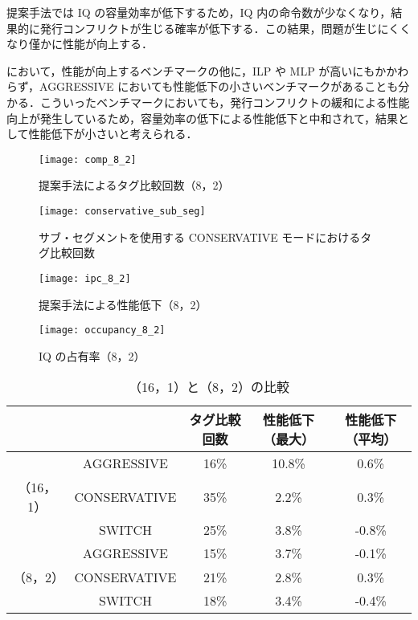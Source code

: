 提案手法では IQ の容量効率が低下するため，IQ 内の命令数が少なくなり，結果的に発行コンフリクトが生じる確率が低下する．この結果，問題が生じにくくなり僅かに性能が向上する．

において，性能が向上するベンチマークの他に，ILP や MLP が高いにもかかわらず，AGGRESSIVE においても性能低下の小さいベンチマークがあることも分かる．こういったベンチマークにおいても，発行コンフリクトの緩和による性能向上が発生しているため，容量効率の低下による性能低下と中和されて，結果として性能低下が小さいと考えられる．

\begin{figure}[htb]
  \centering
  \texttt{[image: comp\_8\_2]}
  \caption{提案手法によるタグ比較回数（8，2）}
  \label{fig:comp_8_2}
\end{figure}

\begin{figure}[htb]
  \centering
  \texttt{[image: conservative\_sub\_seg]}
  \caption{サブ・セグメントを使用する CONSERVATIVE モードにおけるタグ比較回数}
  \label{fig:conservative_sub_seg}
\end{figure}

\begin{figure}[htb]
  \centering
  \texttt{[image: ipc\_8\_2]}
  \caption{提案手法による性能低下（8，2）}
  \label{fig:ipc_8_2}
\end{figure}
\begin{figure}[htb]
  \centering
  \texttt{[image: occupancy\_8\_2]}
  \caption{IQ の占有率（8，2）}
  \label{fig:occupancy_8_2}
\end{figure}

\begin{table}[htb]
  \caption{（16，1）と（8，2）の比較}
  \footnotesize
  \center
    \begin{tabular}{cc|c|c|c} \hline \hline
     & & タグ比較回数 & 性能低下（最大） & 性能低下（平均）\\\hline
     & AGGRESSIVE  & 16\%  & 10.8\% & 0.6\% \\
    （16，1） & CONSERVATIVE & 35\% & 2.2\% & 0.3\% \\ \
     & SWITCH & 25\% & 3.8\% & -0.8\% \\ \hline
     & AGGRESSIVE & 15\% & 3.7\% & -0.1\% \\
    （8，2） & CONSERVATIVE & 21\% & 2.8\% & 0.3\% \\ 
     & SWITCH & 18\% & 3.4\% & -0.4\% \\ \hline
  \end{tabular}
  \label{tab:subseg_eval}
\end{table}

